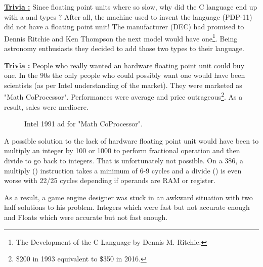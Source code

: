 \documentclass[book.tex]{subfiles}
\begin{document}
 \textbf{\underline{Trivia :}} Since floating point units where so slow, why did the C language end up with a  and  types ? After all, the machine used to invent the language (PDP-11) did not have a floating point unit! The manufacturer (DEC) had promised to Dennis Ritchie and Ken Thompson the next model would have one\footnote{The Development of the C Language by Dennis M. Ritchie.}. Being astronomy enthusiasts they decided to add those two types to their language.\\
\par


\textbf{\underline{Trivia :}} People who really wanted an hardware floating point unit could buy one. In the 90s the only people who could possibly want one would have been scientists (as per Intel understanding of the market). They were marketed as "Math CoProcessor". Performances were average and price outrageous\footnote{\$200 in 1993 equivalent to \$350 in 2016.}. As a result, sales were mediocre.\\
\begin{figure}[H]
\centering
\caption{Intel 1991 ad for "Math CoProcessor".}
\label{fig:fp_internals}
\end{figure}



\par
A possible solution to the lack of hardware floating point unit would have been to multiply an integer by 100 or 1000 to perform fractional operation and then divide to go back to integers. That is unfortunately not possible. On a 386, a multiply () instruction takes a minimum of 6-9 cycles and a divide () is even worse with 22/25 cycles depending if operands are RAM or register.\\ 
\par
As a result, a game engine designer was stuck in an awkward situation with two half solutions to his problem. Integers which were fast but not accurate enough and Floats which were accurate but not fast enough.\\
\par
  
\end{document}
